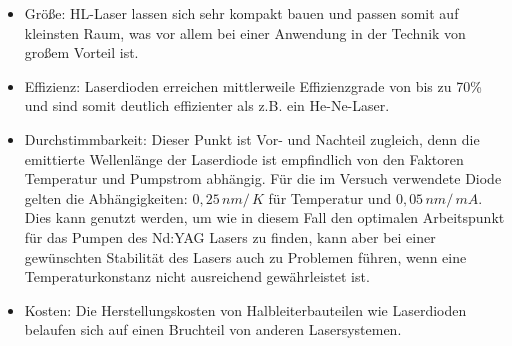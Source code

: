 \documentclass[twoside,colorback,accentcolor=tud4c,11pt]{tudreport}
\begin{document}
\begin{itemize}
\item Größe: HL-Laser lassen sich sehr kompakt bauen und passen somit auf kleinsten Raum, was vor allem bei einer Anwendung in der Technik von großem Vorteil ist.
\item Effizienz: Laserdioden erreichen mittlerweile Effizienzgrade von bis zu 70\% und sind somit deutlich effizienter als z.B. ein He-Ne-Laser.
\item Durchstimmbarkeit: Dieser Punkt ist Vor- und Nachteil zugleich, denn die emittierte Wellenlänge der Laserdiode ist empfindlich von den Faktoren Temperatur und Pumpstrom abhängig. Für die im Versuch verwendete Diode gelten die Abhängigkeiten: $0,25\,\si{nm}/\,\si{K}$ für Temperatur und $0,05\,\si{nm}/\,\si{mA}$. Dies kann genutzt werden, um wie in diesem Fall den optimalen Arbeitspunkt für das Pumpen des Nd:YAG Lasers zu finden, kann aber bei einer gewünschten Stabilität des Lasers auch zu Problemen führen, wenn eine Temperaturkonstanz nicht ausreichend gewährleistet ist.
\item Kosten: Die Herstellungskosten von Halbleiterbauteilen wie Laserdioden belaufen sich auf einen Bruchteil von anderen Lasersystemen.
\end{itemize}\cite{1,3}
\end{document}
